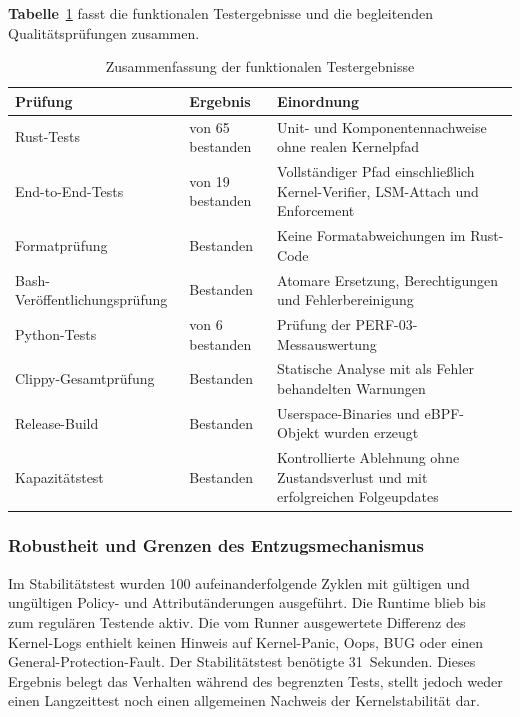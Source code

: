\textbf{Tabelle}~\ref{tab:funktionale-ergebnisse} fasst die funktionalen Testergebnisse und die begleitenden Qualitätsprüfungen zusammen.

\begin{table}[htbp]
    \centering

    \begin{tabular}{>{\raggedright\arraybackslash}p{}>{\raggedright\arraybackslash}p{}p{}}
        \hline
        \textbf{Prüfung} & \textbf{Ergebnis} & \textbf{Einordnung} \\
        \hline
        Rust-Tests & 65 von 65 bestanden & Unit- und Komponentennachweise ohne realen
        Kernelpfad \\
        End-to-End-Tests & 19 von 19 bestanden & Vollständiger Pfad einschließlich
        Kernel-Verifier, LSM-Attach und Enforcement \\
        Formatprüfung & Bestanden & Keine Formatabweichungen im Rust-Code \\
        Bash-Veröffentlichungsprüfung & Bestanden & Atomare Ersetzung, Berechtigungen und Fehlerbereinigung \\
        Python-Tests & 6 von 6 bestanden & Prüfung der PERF-03-Messauswertung \\
        Clippy-Gesamtprüfung & Bestanden & Statische Analyse mit als Fehler behandelten
        Warnungen \\
        Release-Build & Bestanden & Userspace-Binaries und eBPF-Objekt wurden erzeugt \\
        Kapazitätstest & Bestanden & Kontrollierte Ablehnung ohne Zustandsverlust und mit
        erfolgreichen Folgeupdates \\
        \hline
    \end{tabular}
    \caption{Zusammenfassung der funktionalen Testergebnisse}
    \label{tab:funktionale-ergebnisse}
\end{table}

\subsubsection{Robustheit und Grenzen des Entzugsmechanismus}

Im Stabilitätstest wurden 100 aufeinanderfolgende Zyklen mit gültigen und ungültigen Policy- und
Attributänderungen ausgeführt. Die Runtime blieb bis zum regulären Testende aktiv. Die vom Runner
ausgewertete Differenz des Kernel-Logs enthielt keinen Hinweis auf Kernel-Panic, Oops, BUG oder
einen General-Protection-Fault. Der Stabilitätstest benötigte 31~Sekunden. Dieses Ergebnis
belegt das Verhalten während des begrenzten Tests, stellt jedoch weder einen Langzeittest noch
einen allgemeinen Nachweis der Kernelstabilität dar.

